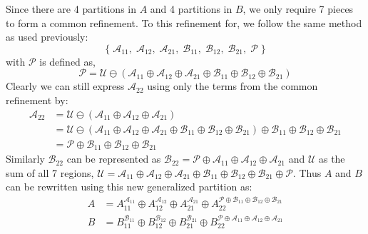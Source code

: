 Since there are 4 partitions in $A$ and 4 partitions in $B$, we only require 7 pieces to form a common refinement.
To this refinement for, we follow the same method as used previously:
\begin{equation}
	\label{eqn:2x2CommonRefinement}
	\Big\{ \;
		\mathcal{A}_{11}, \; \mathcal{A}_{12}, \;  \mathcal{A}_{21}, \;
		\mathcal{B}_{11}, \; \mathcal{B}_{12}, \; \mathcal{B}_{21}, \; \mathcal{P} 
	\; \Big\}
\end{equation}
with $\mathcal{P}$ is defined as,
\begin{equation*}
	\mathcal{P} = \mathcal{U} 
		\ominus \left( \mathcal{A}_{11} \oplus \mathcal{A}_{12} \oplus \mathcal{A}_{21} \oplus
				\mathcal{B}_{11} \oplus \mathcal{B}_{12} \oplus \mathcal{B}_{21} \right)
\end{equation*}
Clearly we can still express $\mathcal{A}_{22}$ using only the terms from the common refinement by:
\begin{align*}
	\mathcal{A}_{22} 
		&= \mathcal{U} \ominus (\mathcal{A}_{11} \oplus \mathcal{A}_{12} \oplus \mathcal{A}_{21}) \\[-0.5em]
		& = \mathcal{U} \ominus (\mathcal{A}_{11} \oplus \mathcal{A}_{12} \oplus \mathcal{A}_{21} 
			\oplus \mathcal{B}_{11} \oplus \mathcal{B}_{12} \oplus \mathcal{B}_{21}) 
			\oplus \mathcal{B}_{11} \oplus \mathcal{B}_{12} \oplus \mathcal{B}_{21}\\[-0.5em]
		&= \mathcal{P} \oplus \mathcal{B}_{11} \oplus \mathcal{B}_{12} \oplus \mathcal{B}_{21}
\end{align*}
Similarly $\mathcal{B}_{22}$ can be represented as $\mathcal{B}_{22} = \mathcal{P} \oplus \mathcal{A}_{11} \oplus \mathcal{A}_{12} \oplus \mathcal{A}_{21}$
and $\mathcal{U}$ as the sum of all 7 regions, 
$\mathcal{U} = 	\mathcal{A}_{11} \oplus \mathcal{A}_{12} \oplus \mathcal{A}_{21} \oplus 
				\mathcal{B}_{11} \oplus \mathcal{B}_{12} \oplus \mathcal{B}_{21} \oplus \mathcal{P}$.
Thus $A$ and $B$ can be rewritten using this new generalized partition as:
\begin{align*}
	A &= A_{11}^{\mathcal{A}_{11}} \oplus 
		A_{12}^{\mathcal{A}_{12}} \oplus 
		A_{21}^{\mathcal{A}_{21}} \oplus 
		A_{22}^{\mathcal{P} \oplus \mathcal{B}_{11} \oplus \mathcal{B}_{12} \oplus \mathcal{B}_{21}} \\
	B &= B_{11}^{\mathcal{B}_{11}} \oplus 
		B_{12}^{\mathcal{B}_{12}} \oplus 
		B_{21}^{\mathcal{B}_{21}} \oplus 
		B_{22}^{\mathcal{P} \oplus \mathcal{A}_{11} \oplus \mathcal{A}_{12} \oplus \mathcal{A}_{21}} 
\end{align*}

